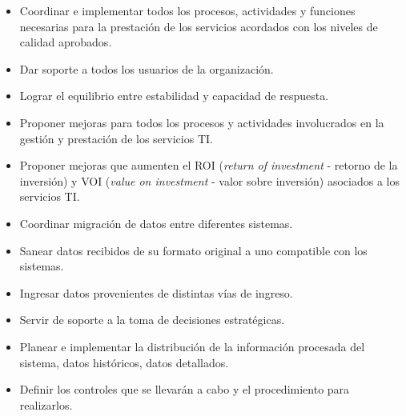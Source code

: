     
    \begin{itemize}
		\item Coordinar e implementar todos los procesos, actividades y funciones necesarias para la prestación de los servicios acordados con los niveles de calidad aprobados.
		\item Dar soporte a todos los usuarios de la organización.
		\item Lograr el equilibrio entre estabilidad y capacidad de respuesta.
		\item Proponer mejoras para todos los procesos y actividades involucrados en la gestión y prestación de los servicios TI.
		\item Proponer mejoras que aumenten el ROI (\textit{return of investment} - retorno de la inversión) y VOI (\textit{value on investment} - valor sobre inversión) asociados a los servicios TI.
        \item Coordinar migración de datos entre diferentes sistemas.
        \item Sanear datos recibidos de su formato original a uno compatible con los sistemas.
        \item Ingresar datos provenientes de distintas vías de ingreso.
        \item Servir de soporte a la toma de decisiones estratégicas.
        \item Planear e implementar la distribución de la información procesada del sistema, datos históricos, datos detallados.
        \item Definir los controles que se llevarán a cabo y el procedimiento para realizarlos.
        
	\end{itemize}
    
